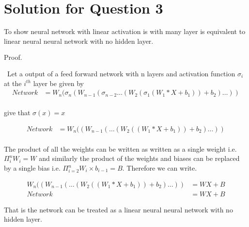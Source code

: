 \documentclass[12pt]{report}
\begin{document}
\chapter{Solution for Question 3}
To show neural network with linear activation is with many layer is equivalent to linear neural neural network with no hidden layer.
\

\noindent Proof.	

\
Let a output of a feed forward network with n layers and activation function $\sigma_i$ at the $i^{th}$ layer be given by 
\begin{equation*} \label{eq1}
	\begin{split}
	Network & = W_n(\sigma_n(W_{n-1}(\sigma_{n-2} \dots (W_2(\sigma_1(W_1*X + b_1) )+b_2) \dots )) \\
	\end{split}
\end{equation*}

give that $\sigma(x) = x$

\begin{equation*}
\begin{split}
Network & = W_n((W_{n-1}(\dots (W_2((W_1*X + b_1) )+b_2) \dots )) \\
\end{split}
\end{equation*}

The product of all the weights can be written as written as a single weight i.e. $\Pi_i^n W_i = W$ and similarly the product of the weights and biases can be replaced by a single bias i.e. $\Pi_{i=2}^n W_i \times b_{i-1} = B$. Therefore we can write.

\begin{equation*}
	\begin{split}
		W_n((W_{n-1}(\dots (W_2((W_1*X + b_1) )+b_2) \dots )) & = WX + B \\
		Network &= WX + B 
	\end{split}
\end{equation*}

That is the network can be treated as a linear neural neural network with no hidden layer.
\end{document}
